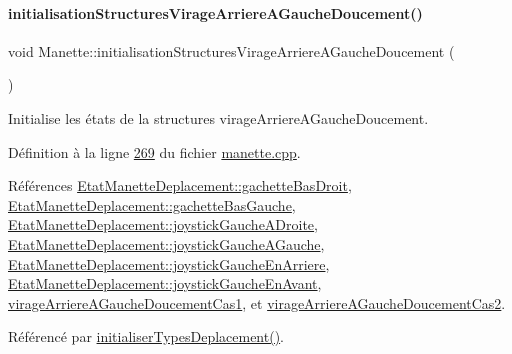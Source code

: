 \mbox{\label{class_manette_a345202d80c6b1370284103878e690363}} 
\paragraph{\texorpdfstring{initialisation\+Structures\+Virage\+Arriere\+A\+Gauche\+Doucement()}{initialisationStructuresVirageArriereAGaucheDoucement()}}
{\footnotesize\ttfamily void Manette\+::initialisation\+Structures\+Virage\+Arriere\+A\+Gauche\+Doucement (\begin{DoxyParamCaption}{ }\end{DoxyParamCaption})\hspace{0.3cm}{\ttfamily [private]}}



Initialise les états de la structures virage\+Arriere\+A\+Gauche\+Doucement. 



Définition à la ligne \hyperlink{manette_8cpp_source_l00269}{269} du fichier \hyperlink{manette_8cpp_source}{manette.\+cpp}.



Références \hyperlink{manette_8h_source_l00185}{Etat\+Manette\+Deplacement\+::gachette\+Bas\+Droit}, \hyperlink{manette_8h_source_l00184}{Etat\+Manette\+Deplacement\+::gachette\+Bas\+Gauche}, \hyperlink{manette_8h_source_l00183}{Etat\+Manette\+Deplacement\+::joystick\+Gauche\+A\+Droite}, \hyperlink{manette_8h_source_l00182}{Etat\+Manette\+Deplacement\+::joystick\+Gauche\+A\+Gauche}, \hyperlink{manette_8h_source_l00181}{Etat\+Manette\+Deplacement\+::joystick\+Gauche\+En\+Arriere}, \hyperlink{manette_8h_source_l00180}{Etat\+Manette\+Deplacement\+::joystick\+Gauche\+En\+Avant}, \hyperlink{manette_8h_source_l00240}{virage\+Arriere\+A\+Gauche\+Doucement\+Cas1}, et \hyperlink{manette_8h_source_l00241}{virage\+Arriere\+A\+Gauche\+Doucement\+Cas2}.



Référencé par \hyperlink{manette_8cpp_source_l00085}{initialiser\+Types\+Deplacement()}.


